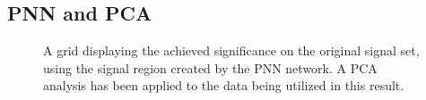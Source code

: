 \subsection{PNN and PCA}
\begin{figure}
    \caption{A grid displaying the achieved significance on the original signal set, using the signal region 
    created by the \ac{PNN} network. A \ac{PCA} analysis has been applied to the data being utilized in this result.}
    \label{fig:PNNPCAGridSig}
\end{figure}
